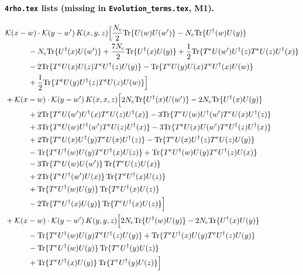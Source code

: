 \documentclass[10pt]{article}
\numberwithin{equation}{section}
\begin{document}
\paragraph{\texttt{4rho.tex} lists (missing in \texttt{Evolution\_terms.tex}, M1).}

\begin{align}
&\mathcal K(x-w)\cdot\mathcal K(y-w')\,K(x,y,z)\Big[\frac{N_c}{2}{\rm Tr}\{U(w)U(w')\}-N_c{\rm Tr}\{U^\dagger(w)U(y)\}\notag\\
&\quad\quad\quad-N_c{\rm Tr}\{U^\dagger(x)U(w')\}+\frac{7 N_c}{2}{\rm Tr}\{U^\dagger(x)U(y)\}+\frac{1}{2}{\rm Tr}\{T^eU(w')U^\dagger(z)T^eU(z)U^\dagger(x)\}\notag\\
&\quad\quad\quad-2{\rm Tr}\{T^eU(x)U(z)T^eU^\dagger(z)U(y)\}-{\rm Tr}\{T^eU(y)U(x)T^eU^\dagger(x)U(w)\}\notag\\
&\quad\quad\quad+\frac{1}{2}{\rm Tr}\{T^eU(y)U^\dagger(z)T^eU(z)U(w)\}\Big]\notag\\
&+\mathcal K(x-w)\cdot\mathcal K(y-w')\,K(x,x,z)\Big[2 N_c{\rm Tr}\{U^\dagger(x)U(w')\}-2 N_c{\rm Tr}\{U^\dagger(x)U(y)\}\notag\\
&\quad\quad\quad+2{\rm Tr}\{T^eU(w')U^\dagger(x)T^eU(z)U^\dagger(x)\}-3{\rm Tr}\{T^eU(w)U^\dagger(w')T^eU(x)U^\dagger(z)\}\notag\\
&\quad\quad\quad+3{\rm Tr}\{T^eU(w)U^\dagger(w')T^eU(z)U^\dagger(x)\}-3{\rm Tr}\{T^eU(x)U(w')T^eU^\dagger(z)U^\dagger(x)\}\notag\\
&\quad\quad\quad+2{\rm Tr}\{T^eU(x)U^\dagger(y)T^eU(x)U^\dagger(z)\}-{\rm Tr}\{T^eU(x)U^\dagger(z)T^eU(z)U(y)\}\notag\\
&\quad\quad\quad-{\rm Tr}\{T^eU^\dagger(w)U(y)T^eU^\dagger(x)U(z)\}+{\rm Tr}\{T^eU^\dagger(w)U(y)T^eU^\dagger(z)U(x)\}\notag\\
&\quad\quad\quad-3{\rm Tr}\{T^eU(w)U(w')\}\,{\rm Tr}\{T^eU(z)U(x)\}\notag\\
&\quad\quad\quad+2{\rm Tr}\{T^eU^\dagger(w')U(x)\}\,{\rm Tr}\{T^eU^\dagger(x)U(z)\}\notag\\
&\quad\quad\quad+{\rm Tr}\{T^eU^\dagger(w)U(y)\}\,{\rm Tr}\{T^eU^\dagger(x)U(z)\}\notag\\
&\quad\quad\quad-2{\rm Tr}\{T^eU^\dagger(x)U(y)\}\,{\rm Tr}\{T^eU^\dagger(x)U(z)\}\Big]\notag\\
&+\mathcal K(x-w)\cdot\mathcal K(y-w')\,K(y,y,z)\Big[2 N_c{\rm Tr}\{U^\dagger(w)U(y)\}-2 N_c{\rm Tr}\{U^\dagger(x)U(y)\}\notag\\
&\quad\quad\quad-{\rm Tr}\{T^eU^\dagger(w)U(y)T^eU^\dagger(z)U(y)\}+{\rm Tr}\{T^eU^\dagger(x)U(y)T^eU^\dagger(z)U(y)\}\notag\\
&\quad\quad\quad-{\rm Tr}\{T^eU^\dagger(w)U(y)\}\,{\rm Tr}\{T^eU^\dagger(y)U(z)\}\notag\\
&\quad\quad\quad+{\rm Tr}\{T^eU^\dagger(x)U(y)\}\,{\rm Tr}\{T^eU^\dagger(y)U(z)\}\Big]
\label{eq:list5}
\end{align}
\end{document}
